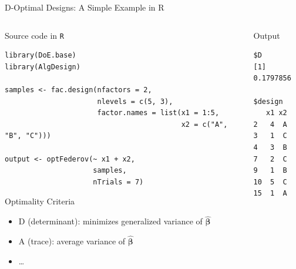 \documentclass[10pt, compress, aspectratio=169, xcolor={table,usenames,dvipsnames}]{beamer}
\begin{document}
\begin{frame}[label={sec:orgcb0a758},fragile]{D-Optimal Designs: A Simple Example in R}
 \begin{columns}
\begin{column}{0.7\columnwidth}
\begin{block}{Source code in \texttt{R}}
\vspace{-.2cm}

\lstset{language=r,label= ,caption= ,captionpos=b,numbers=none}
\begin{lstlisting}
library(DoE.base)
library(AlgDesign)

samples <- fac.design(nfactors = 2,
                      nlevels = c(5, 3),
                      factor.names = list(x1 = 1:5,
                                          x2 = c("A", "B", "C")))

output <- optFederov(~ x1 + x2,
                     samples,
                     nTrials = 7)
\end{lstlisting}

\begin{block}{Optimality Criteria}
\begin{itemize}
\item \alert{D} (determinant): minimizes generalized variance of \(\bm{\hat{\beta}}\)
\item \alert{A} (trace): average variance of \(\bm{\hat{\beta}}\)
\item \dots{}
\end{itemize}
\end{block}
\end{block}
\end{column}


\begin{column}{0.3\columnwidth}
\begin{block}{Output}
\vspace{-.2cm}
\scriptsize

\begin{verbatim}
$D
[1] 0.1797856

$design
   x1 x2
2   4  A
3   1  C
4   3  B
7   2  C
9   1  B
10  5  C
15  1  A
\end{verbatim}


\normalsize
\end{block}
\end{column}
\end{columns}
\end{frame}
\end{document}

